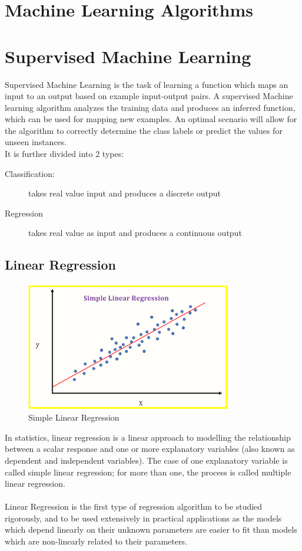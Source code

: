 \section*{Machine Learning Algorithms}

\section*{Supervised Machine Learning}
Supervised Machine Learning is the task of learning a function which maps an input to an output based on example input-output pairs. A supervised Machine learning algorithm analyzes the training data and produces an inferred function, which can be used for mapping new examples. An optimal scenario will allow for the algorithm to correctly determine the class labels or predict the values for unseen instances.\\
It is further divided into 2 types:
\begin{description}
    \item[Classification:]{takes real value input and produces a discrete output}
    \item[Regression]{takes real value as input and produces a continuous output}
\end{description}


\subsection*{Linear Regression}
\begin{figure}[!ht]
	\centering
	\includegraphics[width=0.8\textwidth]{images/linear-regression.png}
	\caption{Simple Linear Regression}
	\centering
	\label{label:file_name}
\end{figure}
In statistics, linear regression is a linear approach to modelling the relationship between a scalar response and one or more explanatory variables (also known as dependent and independent variables). The case of one explanatory variable is called simple linear regression; for more than one, the process is called multiple linear regression.\\
\\
Linear Regression is the first type of regression algorithm to be studied rigorously, and to be used extensively in practical applications as the models which depend linearly on their unknown parameters are easier to fit than models which are non-linearly related to their parameters.


